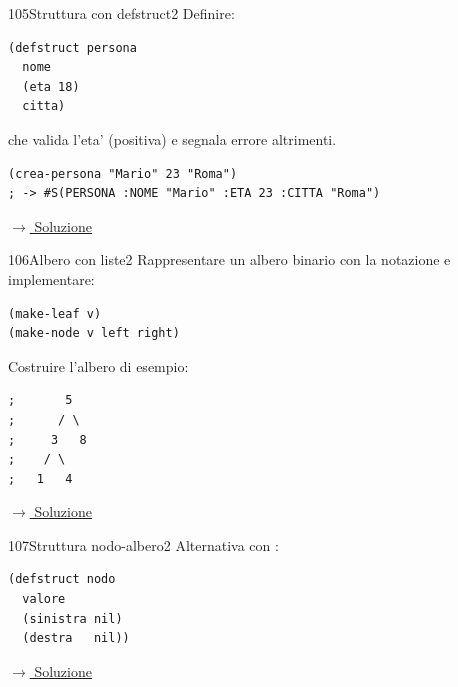 \label{ex:105}
\begin{stdbox}{105}{Struttura con defstruct}{2}
Definire:
\begin{lstlisting}
(defstruct persona
  nome
  (eta 18)
  citta)
\end{lstlisting}
  che valida l'eta'
(positiva) e segnala errore altrimenti.
\begin{lstlisting}
(crea-persona "Mario" 23 "Roma")
; -> #S(PERSONA :NOME "Mario" :ETA 23 :CITTA "Roma")
\end{lstlisting}


\small\color{black!55}\hyperref[sol:105]{$\rightarrow$ Soluzione}\normalsize\color{black}
\end{stdbox}

\label{ex:106}
\begin{stdbox}{106}{Albero con liste}{2}
Rappresentare un albero binario con la notazione 
e implementare:
\begin{lstlisting}
(make-leaf v)
(make-node v left right)
\end{lstlisting}
Costruire l'albero di esempio:
\begin{lstlisting}
;       5
;      / \
;     3   8
;    / \
;   1   4
\end{lstlisting}

\small\color{black!55}\hyperref[sol:106]{$\rightarrow$ Soluzione}\normalsize\color{black}
\end{stdbox}

\label{ex:107}
\begin{colbox}{107}{Struttura nodo-albero}{2}
Alternativa con :
\begin{lstlisting}
(defstruct nodo
  valore
  (sinistra nil)
  (destra   nil))
\end{lstlisting}

\small\color{black!55}\hyperref[sol:107]{$\rightarrow$ Soluzione}\normalsize\color{black}
\end{colbox}

